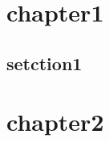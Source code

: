\documentclass{test}
\begin{document}
\chapter{chapter1}

\section{setction1}

\lipsum[1] \cite{bib-conference}

\lipsum[2] \cite{bib-article}

\chapter{chapter2}

\lipsum[3]
\cite{emory-ctrl}



\end{document}
